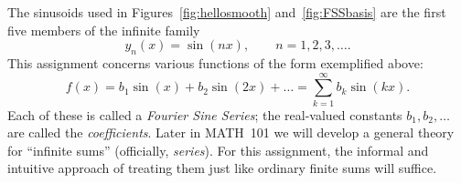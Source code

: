 \documentclass{exam}
\begin{document}
The sinusoids used in Figures~\ref{fig:hellosmooth} and~\ref{fig:FSSbasis}
are the first five members of the infinite family
\begin{equation}
y_n(x) = \sin(nx),\qquad n=1,2,3,\ldots.
\label{eq:basisdef}
\end{equation}
This assignment concerns various functions of the form exemplified above:
\begin{equation}
f(x) 
= b_1\sin(x) + b_2\sin(2x) + \ldots
= \sum_{k=1}^\infty b_k\sin(kx).
\label{eq:FSS}\end{equation}
Each of these is called a \emph{Fourier Sine Series};
the real-valued constants $b_1,b_2,\ldots$ are called
the \emph{coefficients}.
Later in MATH~101 we will develop a general theory for
``infinite sums'' (officially, \emph{series}).
For this assignment, 
the informal and intuitive approach of treating them
just like ordinary finite sums will suffice.

\goodbreak
\end{document}
